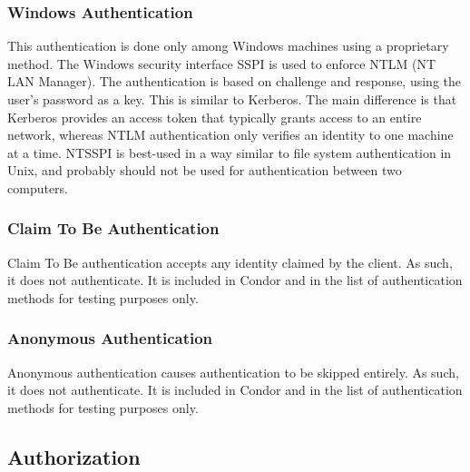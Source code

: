 \subsubsection{\label{sec:NTSSPI-Authentication}Windows Authentication}
This authentication is done only among Windows machines using
a proprietary method.
The Windows security interface SSPI is used to enforce NTLM
(NT LAN Manager).
The authentication is based on challenge and response, using the user's
password as a key.
This is similar to Kerberos.
The main difference 
is that Kerberos provides an access token that typically grants
access to an entire network, whereas NTLM authentication only 
verifies an identity to one machine at a time.
NTSSPI is best-used in a way similar to file system authentication in
Unix, and probably should not be used for authentication between two
computers. 

\subsubsection{\label{sec:CLAIM-Authentication}Claim To Be Authentication}
Claim To Be authentication accepts any identity claimed by the client.
As such, it does not authenticate.
It is included in Condor and in the list of authentication methods
for testing purposes only.

\subsubsection{\label{sec:ANON-Authentication}Anonymous Authentication}
Anonymous authentication causes authentication to be skipped entirely.
As such, it does not authenticate.
It is included in Condor and in the list of authentication methods
for testing purposes only.


\subsection{\label{sec:Security-Authorization}Authorization}

